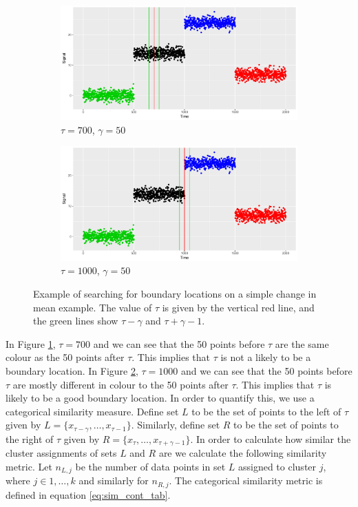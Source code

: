 \begin{figure}[H]
  \centering
  \begin{subfigure}{0.45\textwidth}
    \centering
    \includegraphics[width = \textwidth]{cim_6.pdf}
    \caption{$\tau = 700 $, $\gamma = 50$}
  \label{fig:cim_6}
  \end{subfigure}
  \begin{subfigure}{0.45\textwidth}
    \centering
    \includegraphics[width = \textwidth]{cim_7.pdf}
  \caption{$\tau = 1000 $, $\gamma = 50$}
  \label{fig:cim_7}
  \end{subfigure}
  \caption{Example of searching for boundary locations on a simple change in mean example. The value of $\tau$ is given by the vertical red line, and the green lines show $\tau  - \gamma$ and $\tau + \gamma - 1$.}
  \label{fig:change_in_mean}
\end{figure}

In Figure \ref{fig:cim_6}, $\tau = 700$ and we can see that the 50 points before $\tau$ are the same colour as the 50 points after $\tau$. This implies that $\tau$ is not a likely to be a boundary location. In Figure \ref{fig:cim_7}, $\tau = 1000$ and we can see that the 50 points before $\tau$ are mostly different in colour to the 50 points after $\tau$. This implies that $\tau$ is likely to be a good boundary location. In order to quantify this, we use a categorical similarity measure. Define set $L$ to be the set of points to the left of $\tau$ given by $ L = \{x_{\tau - \gamma}, \ldots, x_{\tau -1}\}$. Similarly, define set $R$ to be the set of points to the right of $\tau$  given by $R = \{x_{\tau}, \ldots, x_{\tau + \gamma -1}\}$. In order to calculate how similar the cluster assignments of sets $L$ and $R$ are we calculate the following similarity metric. Let $n_{L,j}$ be the number of data points in set $L$ assigned to cluster $j$, where $j \in 1, \ldots, k$ and similarly for $n_{R,j}$. The categorical similarity metric is defined in equation \eqref{eq:sim_cont_tab}.


